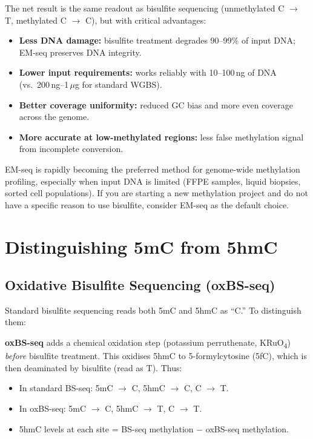 The net result is the same readout as bisulfite sequencing (unmethylated C $\rightarrow$ T, methylated C $\rightarrow$ C), but with critical advantages:

\begin{itemize}[itemsep=2pt]
  \item \textbf{Less DNA damage:} bisulfite treatment degrades 90--99\% of input DNA; EM-seq preserves DNA integrity.
  \item \textbf{Lower input requirements:} works reliably with 10--100\,ng of DNA (vs.\ 200\,ng--1\,$\mu$g for standard WGBS).
  \item \textbf{Better coverage uniformity:} reduced GC bias and more even coverage across the genome.
  \item \textbf{More accurate at low-methylated regions:} less false methylation signal from incomplete conversion.
\end{itemize}

\begin{tipbox}
EM-seq is rapidly becoming the preferred method for genome-wide methylation profiling, especially when input DNA is limited (FFPE samples, liquid biopsies, sorted cell populations). If you are starting a new methylation project and do not have a specific reason to use bisulfite, consider EM-seq as the default choice.
\end{tipbox}

\section{Distinguishing 5mC from 5hmC}
\label{sec:methylation:5hmc}

\subsection{Oxidative Bisulfite Sequencing (oxBS-seq)}
\label{subsec:methylation:oxbs-tab}

Standard bisulfite sequencing reads both 5mC and 5hmC as ``C.'' To distinguish them:

\textbf{oxBS-seq} adds a chemical oxidation step (potassium perruthenate, KRuO\textsubscript{4}) \textit{before} bisulfite treatment. This oxidises 5hmC to 5-formylcytosine (5fC), which is then deaminated by bisulfite (read as T). Thus:

\begin{itemize}[itemsep=2pt]
  \item In standard BS-seq: 5mC $\rightarrow$ C, 5hmC $\rightarrow$ C, C $\rightarrow$ T.
  \item In oxBS-seq: 5mC $\rightarrow$ C, 5hmC $\rightarrow$ T, C $\rightarrow$ T.
  \item 5hmC levels at each site = BS-seq methylation $-$ oxBS-seq methylation.
\end{itemize}

